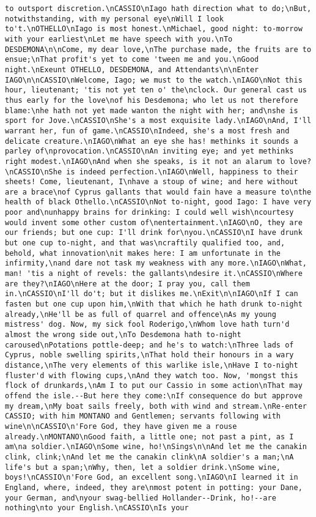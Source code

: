 \begin{verbatim}
to outsport discretion.\nCASSIO\nIago hath direction what to do;\nBut, notwithstanding, with my personal eye\nWill I look to't.\nOTHELLO\nIago is most honest.\nMichael, good night: to-morrow with your earliest\nLet me have speech with you.\nTo DESDEMONA\n\nCome, my dear love,\nThe purchase made, the fruits are to ensue;\nThat profit's yet to come 'tween me and you.\nGood night.\nExeunt OTHELLO, DESDEMONA, and Attendants\n\nEnter IAGO\n\nCASSIO\nWelcome, Iago; we must to the watch.\nIAGO\nNot this hour, lieutenant; 'tis not yet ten o' the\nclock. Our general cast us thus early for the love\nof his Desdemona; who let us not therefore blame:\nhe hath not yet made wanton the night with her; and\nshe is sport for Jove.\nCASSIO\nShe's a most exquisite lady.\nIAGO\nAnd, I'll warrant her, fun of game.\nCASSIO\nIndeed, she's a most fresh and delicate creature.\nIAGO\nWhat an eye she has! methinks it sounds a parley of\nprovocation.\nCASSIO\nAn inviting eye; and yet methinks right modest.\nIAGO\nAnd when she speaks, is it not an alarum to love?\nCASSIO\nShe is indeed perfection.\nIAGO\nWell, happiness to their sheets! Come, lieutenant, I\nhave a stoup of wine; and here without are a brace\nof Cyprus gallants that would fain have a measure to\nthe health of black Othello.\nCASSIO\nNot to-night, good Iago: I have very poor and\nunhappy brains for drinking: I could well wish\ncourtesy would invent some other custom of\nentertainment.\nIAGO\nO, they are our friends; but one cup: I'll drink for\nyou.\nCASSIO\nI have drunk but one cup to-night, and that was\ncraftily qualified too, and, behold, what innovation\nit makes here: I am unfortunate in the infirmity,\nand dare not task my weakness with any more.\nIAGO\nWhat, man! 'tis a night of revels: the gallants\ndesire it.\nCASSIO\nWhere are they?\nIAGO\nHere at the door; I pray you, call them in.\nCASSIO\nI'll do't; but it dislikes me.\nExit\n\nIAGO\nIf I can fasten but one cup upon him,\nWith that which he hath drunk to-night already,\nHe'll be as full of quarrel and offence\nAs my young mistress' dog. Now, my sick fool Roderigo,\nWhom love hath turn'd almost the wrong side out,\nTo Desdemona hath to-night caroused\nPotations pottle-deep; and he's to watch:\nThree lads of Cyprus, noble swelling spirits,\nThat hold their honours in a wary distance,\nThe very elements of this warlike isle,\nHave I to-night fluster'd with flowing cups,\nAnd they watch too. Now, 'mongst this flock of drunkards,\nAm I to put our Cassio in some action\nThat may offend the isle.--But here they come:\nIf consequence do but approve my dream,\nMy boat sails freely, both with wind and stream.\nRe-enter CASSIO; with him MONTANO and Gentlemen; servants following with wine\n\nCASSIO\n'Fore God, they have given me a rouse already.\nMONTANO\nGood faith, a little one; not past a pint, as I am\na soldier.\nIAGO\nSome wine, ho!\nSings\n\nAnd let me the canakin clink, clink;\nAnd let me the canakin clink\nA soldier's a man;\nA life's but a span;\nWhy, then, let a soldier drink.\nSome wine, boys!\nCASSIO\n'Fore God, an excellent song.\nIAGO\nI learned it in England, where, indeed, they are\nmost potent in potting: your Dane, your German, and\nyour swag-bellied Hollander--Drink, ho!--are nothing\nto your English.\nCASSIO\nIs your 
\end{verbatim}
